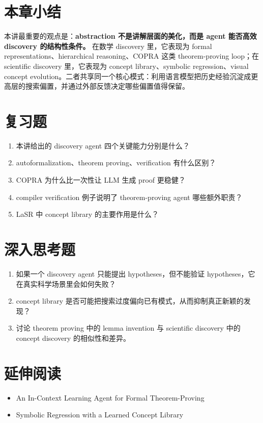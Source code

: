 \documentclass[a4paper]{article}
\begin{document}
\section{本章小结}

本讲最重要的观点是：\textbf{abstraction 不是讲解层面的美化，而是 agent 能否高效 discovery 的结构性条件。} 在数学 discovery 里，它表现为 formal representations、hierarchical reasoning、COPRA 这类 theorem-proving loop；在 scientific discovery 里，它表现为 concept library、symbolic regression、visual concept evolution。二者共享同一个核心模式：利用语言模型把历史经验沉淀成更高层的搜索偏置，并通过外部反馈决定哪些偏置值得保留。

\section{复习题}
\begin{enumerate}
\item 本讲给出的 discovery agent 四个关键能力分别是什么？
\item autoformalization、theorem proving、verification 有什么区别？
\item COPRA 为什么比一次性让 LLM 生成 proof 更稳健？
\item compiler verification 例子说明了 theorem-proving agent 哪些额外职责？
\item LaSR 中 concept library 的主要作用是什么？
\end{enumerate}

\section{深入思考题}
\begin{enumerate}
\item 如果一个 discovery agent 只能提出 hypotheses，但不能验证 hypotheses，它在真实科学场景里会如何失败？
\item concept library 是否可能把搜索过度偏向已有模式，从而抑制真正新颖的发现？
\item 讨论 theorem proving 中的 lemma invention 与 scientific discovery 中的 concept discovery 的相似性和差异。
\end{enumerate}

\section{延伸阅读}
\begin{itemize}
\item An In-Context Learning Agent for Formal Theorem-Proving
\item Symbolic Regression with a Learned Concept Library
\end{itemize}
\end{document}
